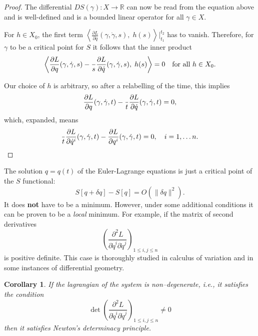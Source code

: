 \documentclass[english,fontsize=11pt,paper=a5,oneside]{scrbook}
\newcommand{\R}{\mathbb{R}}
\newcommand{\lag}{\langle}
\newcommand{\rag}{\rangle}
\let\d\relax
\DeclareMathOperator{\d}{d}
\newtheorem{corollary}[theorem]{Corollary}
\theoremstyle{definition}
\newenvironment{remark}
  {\pushQED{\qed}\renewcommand{\qedsymbol}{$\lozenge$}\remarkx}
  {\popQED\endremarkx}
\begin{document}
\begin{proof}
    The differential $DS(\gamma): X \to \R$ can now be read from the equation above and is well-defined and is a bounded linear operator for all $\gamma\in X$.

    For $h\in X_0$, the first term $\left\lag\frac{\partial L}{\partial \dot q}(\gamma, \dot \gamma, s),\; h(s)\right\rag\Big|_{t_1}^{t_2}$ has to vanish. Therefore, for $\gamma$ to be a critical point for $S$ it follows that the inner product
    \begin{equation}
        \left\lag
            \frac{\partial L}{\partial q}(\gamma, \dot \gamma, s)
            - \frac{\d}{\d s}\frac{\partial L}{\partial \dot q}(\gamma, \dot \gamma, s)
        ,\; h(s)\right\rag = 0 \quad\mbox{for all } h\in X_0.
    \end{equation}

    Our choice of $h$ is arbitrary, so after a relabelling of the time, this implies
    \begin{equation}
        \frac{\partial L}{\partial q}(\gamma, \dot \gamma, t)
            - \frac{\d}{\d t}\frac{\partial L}{\partial \dot q}(\gamma, \dot \gamma, t) = 0,
    \end{equation}
    which, expanded, means
    \begin{equation}
        \frac{\d}{\d t}\frac{\partial L}{\partial \dot q^i}(\gamma, \dot \gamma, t) - \frac{\partial L}{\partial q^i}(\gamma, \dot \gamma, t) = 0, \quad i=1,\ldots n.
    \end{equation}
\end{proof}

\begin{remark}
    The solution $q=q(t)$ of the Euler-Lagrange equations is just a critical point of the $S$ functional:
    \begin{equation}
        S[q + \delta q] - S[q] = O(\|\delta q\|^2).
    \end{equation}
    It does \textbf{not} have to be a minimum. However, under some additional conditions it can be proven to be a \emph{local} minimum.
    For example, if the matrix of second derivatives
    \begin{equation}
        \left(
            \frac{\partial^2 L}{\partial\dot q^i \partial\dot q^j}
        \right)_{1\leq i,j\leq n}
    \end{equation}
    is positive definite.
    This case is thoroughly studied in calculus of variation and in some instances of differential geometry.
\end{remark}

\begin{corollary}
    If the lagrangian of the system is \emph{non--degenerate}, i.e., it satisfies the condition
    \begin{equation}
            \det \left(\frac{\partial^2 L}{\partial\dot q^i \partial\dot q^j}
        \right)_{1\leq i,j\leq n} \neq 0
    \end{equation}
    then it satisfies Newton's determinacy principle.
\end{corollary}
\end{document}
